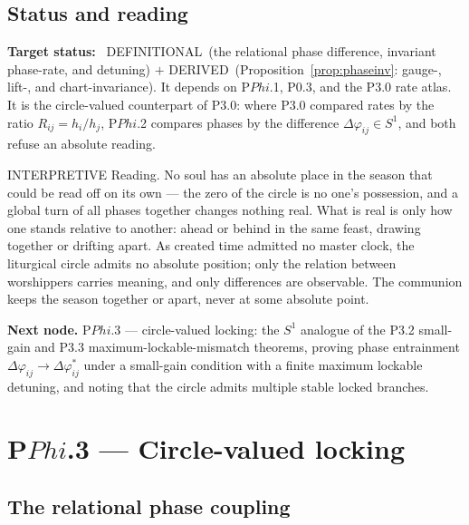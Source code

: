 \documentclass[11pt,a4paper]{article}
\def\Phi{Phi}%
\def\emph#1{#1}%
\newcommand{\stDerived}{\textcolor{cDer}{\textsf{\small DERIVED}}}
\newcommand{\stDef}{\textcolor{cDef}{\textsf{\small DEFINITIONAL}}}
\newcommand{\stInterp}{\textcolor{cInt}{\textsf{\small INTERPRETIVE}}}
\theoremstyle{definition}
\theoremstyle{plain}
\theoremstyle{remark}
\begin{document}
\subsection{Status and reading}

\textbf{Target status:}~
\stDef\ (the relational phase difference, invariant phase-rate, and detuning) \(+\)
\stDerived\ (Proposition~\ref{prop:phaseinv}: gauge-, lift-, and chart-invariance). It depends
on P$\Phi$.1, P0.3, and the P3.0 rate atlas. It is the circle-valued counterpart of P3.0:
where P3.0 compared rates by the ratio \(R_{ij}=h_i/h_j\), P$\Phi$.2 compares phases by the
difference \(\Delta\varphi_{ij}\in S^1\), and both refuse an absolute reading.

\medskip
\stInterp\quad
\emph{Reading.}
No soul has an absolute place in the season that could be read off on its own --- the zero of
the circle is no one's possession, and a global turn of all phases together changes nothing
real. What is real is only how one stands relative to another: ahead or behind in the same
feast, drawing together or drifting apart. As created time admitted no master clock, the
liturgical circle admits no absolute position; only the relation between worshippers carries
meaning, and only differences are observable. The communion keeps the season \emph{together
or apart}, never \emph{at} some absolute point.

\medskip
\textbf{Next node.} P$\Phi$.3 --- circle-valued locking: the \(S^1\) analogue of the P3.2
small-gain and P3.3 maximum-lockable-mismatch theorems, proving phase entrainment
\(\Delta\varphi_{ij}\to\Delta\varphi_{ij}^{*}\) under a small-gain condition with a finite
maximum lockable detuning, and noting that the circle admits multiple stable locked branches.

\section{P$\Phi$.3 --- Circle-valued locking}

\subsection{The relational phase coupling}
\end{document}
